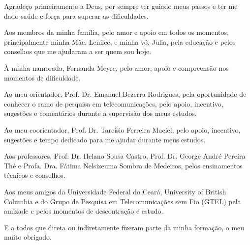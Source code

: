 \begin{agradecimentos}
	Agradeço primeiramente a Deus, por sempre ter guiado meus passos e ter me dado saúde e força para superar as dificuldades.
	
	Aos membros da minha família, pelo amor e apoio em todos os momentos, principalmente minha Mãe, Lenilce, e minha vó, Julia, pela educação e pelos conselhos que me ajudaram a ser quem sou hoje.
	
	À minha namorada, Fernanda Meyre, pelo amor, apoio e compreensão nos momentos de dificuldade.
	
	Ao meu orientador, Prof. Dr. Emanuel Bezerra Rodrigues, pela oportunidade de conhecer o ramo de pesquisa em telecomunicações, pelo apoio, incentivo, sugestões e comentários durante a supervisão dos meus estudos.
	
	Ao meu coorientador, Prof. Dr. Tarcísio Ferreira Maciel, pelo apoio, incentivo, sugestões e tempo dedicado para me ajudar durante meus estudos.
	
	Aos professores, Prof. Dr. Helano Sousa Castro, Prof. Dr. George André Pereira Thé e Profa. Dra. Fátima Nelsizeuma Sombra de Medeiros, pelos ensinamentos técnicos e conselhos. 
	
	Aos meus amigos da Universidade Federal do Ceará, University of British Columbia e do Grupo de Pesquisa em Telecomunicações sem Fio (GTEL) pela amizade e pelos momentos de descontração e estudo.
	
	E a todos que direta ou indiretamente fizeram parte da minha formação, o meu muito obrigado.
\end{agradecimentos}
